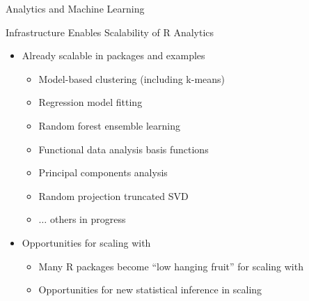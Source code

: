 \begin{frame}{Analytics and Machine Learning}
  \begin{block}{\pbdR Infrastructure Enables Scalability of R Analytics}
  \begin{itemize}
  \item Already scalable in packages and examples
    \begin{itemize}
    \item Model-based clustering (including k-means)
    \item Regression model fitting
    \item Random forest ensemble learning
    \item Functional data analysis basis functions
    \item Principal components analysis
    \item Random projection truncated SVD
    \item $\ldots$ others in progress
    \end{itemize}
  \item Opportunities for scaling with \pbdR
    \begin{itemize}
    \item Many R packages become ``low hanging fruit'' for scaling with \pbdR
    \item Opportunities for new statistical inference in scaling
    \end{itemize}
  \end{itemize}
  \end{block}
\end{frame}
